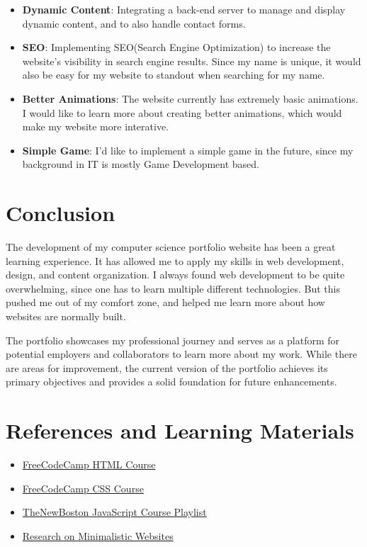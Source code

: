 \documentclass[15pt]{report}
\begin{document}
\begin{itemize}

    \item \textbf{Dynamic Content}: Integrating a back-end server to manage and display dynamic content, and to also handle contact forms.
    \item \textbf{SEO}: Implementing SEO(Search Engine Optimization) to increase the website's visibility in search engine results. Since my name is unique, it would also be easy for my website to standout when searching for my name. 
    \item \textbf{Better Animations}: The website currently has extremely basic animations. I would like to learn more about creating better animations, which would make my website more interative.
    \item \textbf{Simple Game}: I'd like to implement a simple game in the 
    future, since my background in IT is mostly Game Development based.

\end{itemize}

\chapter{Conclusion}

The development of my computer science portfolio website has been a great learning experience. It has allowed me to apply my skills in web development, design, and content organization. I always found web development to be quite overwhelming, since one has to learn multiple different technologies. But this pushed me out of my comfort zone, and helped me learn more about how websites are normally built.

The portfolio  showcases my professional journey and serves as a platform for potential employers and collaborators to learn more about my work. While there are areas for improvement, the current version of the portfolio achieves its primary objectives and provides a solid foundation for future enhancements.

\chapter{References and Learning Materials}
\begin{itemize}
    \item \href{https://www.youtube.com/watch?v=kUMe1FH4CHE}
    {FreeCodeCamp HTML Course}
    
    \item \href{https://www.youtube.com/watch?v=OXGznpKZ_sA}
    {FreeCodeCamp CSS Course}
    
    \item \href{https://www.youtube.com/watch?v=yQaAGmHNn9s&list=PL46F0A159EC02DF82}
    {TheNewBoston JavaScript Course Playlist}
    
    \item \href{https://websitedesigners.com/blog/power-of-minimalistic-web-design/}
    {Research on Minimalistic Websites}
    
\end{itemize}
\end{document}
